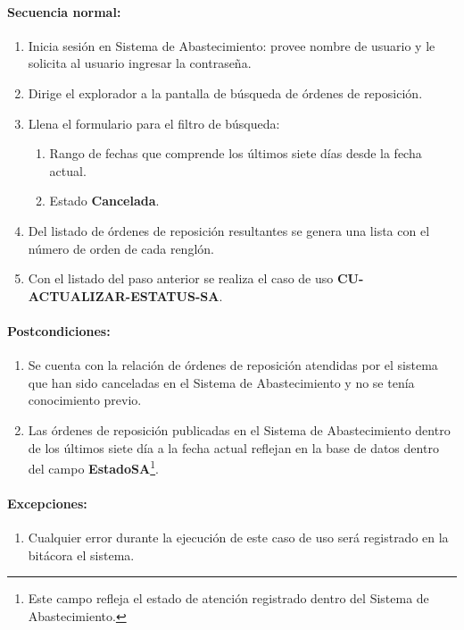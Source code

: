 \paragraph{Secuencia normal:}
\begin{enumerate}
  \item Inicia sesión en Sistema de Abastecimiento: provee nombre de usuario y le solicita al usuario ingresar la contraseña.
  \item Dirige el explorador a la pantalla de búsqueda de órdenes de reposición.
  \item Llena el formulario para el filtro de búsqueda:
  \begin{enumerate}
    \item Rango de fechas que comprende los últimos siete días desde la fecha actual.
    \item Estado \textbf{Cancelada}.
  \end{enumerate}
  \item Del listado de órdenes de reposición resultantes se genera una lista con el número de orden de cada renglón.
  \item Con el listado del paso anterior se realiza el caso de uso \textbf{CU-ACTUALIZAR-ESTATUS-SA}.
\end{enumerate}
\paragraph{Postcondiciones:}
\begin{enumerate}
  \item Se cuenta con la relación de órdenes de reposición atendidas por el sistema que han sido canceladas en el Sistema de Abastecimiento y no se tenía conocimiento previo.
  \item Las órdenes de reposición publicadas en el Sistema de Abastecimiento dentro de los últimos siete día a la fecha actual reflejan en la base de datos dentro del campo \textbf{EstadoSA}\footnote{Este campo refleja el estado de atención registrado dentro del Sistema de Abastecimiento.}.
\end{enumerate}
\paragraph{Excepciones:}
\begin{enumerate}
  \item Cualquier error durante la ejecución de este caso de uso será registrado en la bitácora el sistema.
\end{enumerate}


